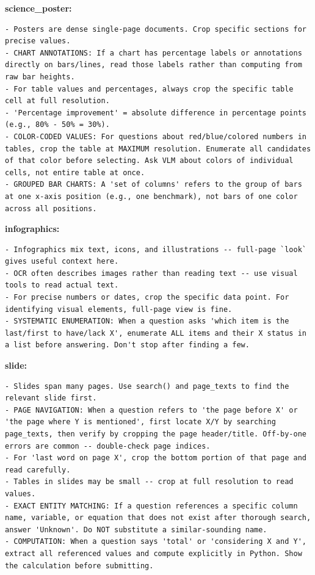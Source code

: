 \documentclass[10pt,twocolumn]{article}
\begin{document}
\textbf{science\_poster:}
\begin{lstlisting}
- Posters are dense single-page documents. Crop specific sections for precise values.
- CHART ANNOTATIONS: If a chart has percentage labels or annotations directly on bars/lines, read those labels rather than computing from raw bar heights.
- For table values and percentages, always crop the specific table cell at full resolution.
- 'Percentage improvement' = absolute difference in percentage points (e.g., 80% - 50% = 30%).
- COLOR-CODED VALUES: For questions about red/blue/colored numbers in tables, crop the table at MAXIMUM resolution. Enumerate all candidates of that color before selecting. Ask VLM about colors of individual cells, not entire table at once.
- GROUPED BAR CHARTS: A 'set of columns' refers to the group of bars at one x-axis position (e.g., one benchmark), not bars of one color across all positions.
\end{lstlisting}

\textbf{infographics:}
\begin{lstlisting}
- Infographics mix text, icons, and illustrations -- full-page `look` gives useful context here.
- OCR often describes images rather than reading text -- use visual tools to read actual text.
- For precise numbers or dates, crop the specific data point. For identifying visual elements, full-page view is fine.
- SYSTEMATIC ENUMERATION: When a question asks 'which item is the last/first to have/lack X', enumerate ALL items and their X status in a list before answering. Don't stop after finding a few.
\end{lstlisting}

\textbf{slide:}
\begin{lstlisting}
- Slides span many pages. Use search() and page_texts to find the relevant slide first.
- PAGE NAVIGATION: When a question refers to 'the page before X' or 'the page where Y is mentioned', first locate X/Y by searching page_texts, then verify by cropping the page header/title. Off-by-one errors are common -- double-check page indices.
- For 'last word on page X', crop the bottom portion of that page and read carefully.
- Tables in slides may be small -- crop at full resolution to read values.
- EXACT ENTITY MATCHING: If a question references a specific column name, variable, or equation that does not exist after thorough search, answer 'Unknown'. Do NOT substitute a similar-sounding name.
- COMPUTATION: When a question says 'total' or 'considering X and Y', extract all referenced values and compute explicitly in Python. Show the calculation before submitting.
\end{lstlisting}
\end{document}
